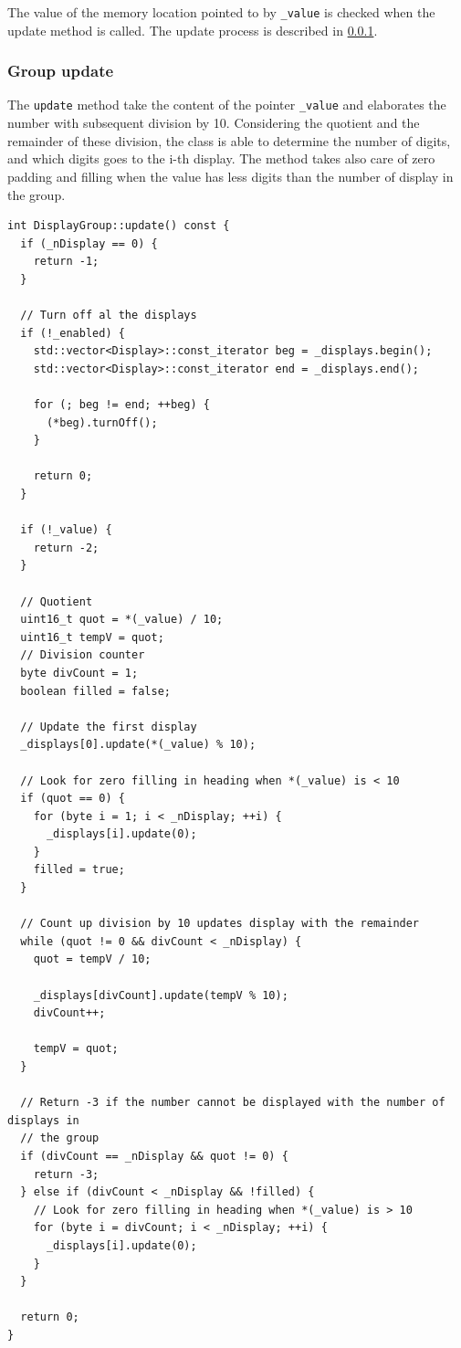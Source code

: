 \documentclass[11pt,english]{article}
\newcommand{\code}[1]{\texttt{#1}}
\begin{document}
The value of the memory location pointed to by \code{\_value} is checked when the update 
method is called. The update process is described in \ref{subsec:group-update}.



\subsubsection{Group update} \label{subsec:group-update}

The \code{update} method take the content of the pointer \code{\_value} and elaborates the 
number with subsequent division by 10. Considering the quotient and the remainder of these 
division, the class is able to determine the number of digits, and which digits goes to the 
i-th display. The method takes also care of zero padding and filling when the value has less 
digits than the number of display in the group.
%
\begin{lstlisting}[label=lis:group-update,caption=DisplayGroup update method]
int DisplayGroup::update() const {
  if (_nDisplay == 0) {
    return -1;
  }

  // Turn off al the displays
  if (!_enabled) {
    std::vector<Display>::const_iterator beg = _displays.begin();
    std::vector<Display>::const_iterator end = _displays.end();

    for (; beg != end; ++beg) {
      (*beg).turnOff();
    }

    return 0;
  }

  if (!_value) {
    return -2;
  }

  // Quotient
  uint16_t quot = *(_value) / 10;
  uint16_t tempV = quot;
  // Division counter
  byte divCount = 1;
  boolean filled = false;

  // Update the first display
  _displays[0].update(*(_value) % 10);

  // Look for zero filling in heading when *(_value) is < 10
  if (quot == 0) {
    for (byte i = 1; i < _nDisplay; ++i) {
      _displays[i].update(0);
    }
    filled = true;
  }

  // Count up division by 10 updates display with the remainder
  while (quot != 0 && divCount < _nDisplay) {
    quot = tempV / 10;

    _displays[divCount].update(tempV % 10);
    divCount++;

    tempV = quot;
  }

  // Return -3 if the number cannot be displayed with the number of displays in
  // the group
  if (divCount == _nDisplay && quot != 0) {
    return -3;
  } else if (divCount < _nDisplay && !filled) {
    // Look for zero filling in heading when *(_value) is > 10
    for (byte i = divCount; i < _nDisplay; ++i) {
      _displays[i].update(0);
    }
  }

  return 0;
}
\end{lstlisting}
\end{document}
